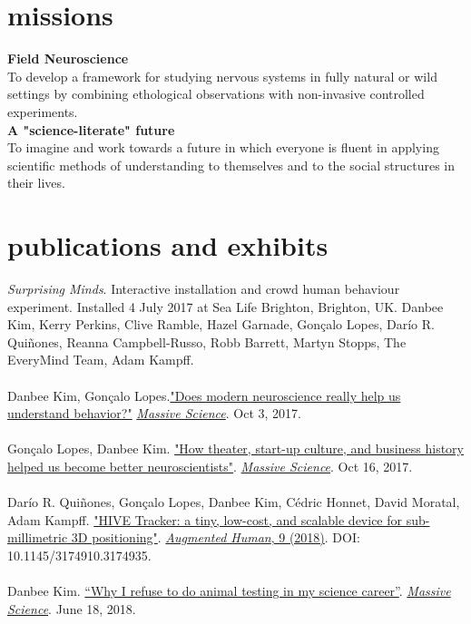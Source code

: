 \documentclass[]{friggeri-cv}
\begin{document}
\section{missions}
\textbf{Field Neuroscience}\\
To develop a framework for studying nervous systems in fully natural or wild settings by combining ethological observations with non-invasive controlled experiments. \\
\textbf{A "science-literate" future}\\
To imagine and work towards a future in which everyone is fluent in applying scientific methods of understanding to themselves and to the social structures in their lives. 

\section{publications and exhibits}

\emph{Surprising Minds}. Interactive installation and crowd human behaviour experiment. Installed 4 July 2017 at Sea Life Brighton, Brighton, UK. Danbee Kim, Kerry Perkins, Clive Ramble, Hazel Garnade, Gon\c{c}alo Lopes, Dar\'{i}o R. Qui\~{n}ones, Reanna Campbell-Russo, Robb Barrett, Martyn Stopps, The EveryMind Team, Adam Kampff.\\
\\
Danbee Kim, Gon\c{c}alo Lopes.\href{https://massivesci.com/articles/neuroscience-behavior-vs-technology/}{"Does modern neuroscience really help us understand behavior?"} \emph{\href{https://massivesci.com}{Massive Science}}. Oct 3, 2017. \\
\\
Gon\c{c}alo Lopes, Danbee Kim. \href{https://massivesci.com/articles/neuroscience-can-learn-from-theater/}{"How theater, start-up culture, and business history helped us become better neuroscientists"}. \emph{\href{https://massivesci.com}{Massive Science}}. Oct 16, 2017.\\
\\
Dar\'{i}o R. Qui\~{n}ones, Gon\c{c}alo Lopes, Danbee Kim, C\'{e}dric Honnet, David Moratal, Adam Kampff. \href{https://www.researchgate.net/publication/322842913_HIVE_Tracker_a_tiny_low-cost_and_scalable_device_for_sub-millimetric_3D_positioning}{"HIVE Tracker: a tiny, low-cost, and scalable device for sub-millimetric 3D positioning"}. \href{http://www.sigah.org/AH2018/}{\emph{Augmented Human}, 9 (2018)}. DOI: 10.1145/3174910.3174935.\\
\\
Danbee Kim. \href{https://massivesci.com/articles/frankenstein-kim-animal-testing/}{“Why I refuse to do animal testing in my science career”}. \emph{\href{https://massivesci.com}{Massive Science}}. June 18, 2018.
\end{document}
